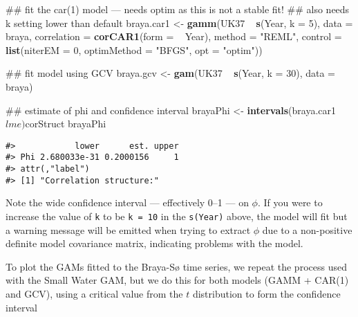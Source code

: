 \documentclass[12pt,]{article}
\newenvironment{Shaded}{\begin{snugshade}}{\end{snugshade}}
\newcommand{\KeywordTok}[1]{\textcolor[rgb]{0.13,0.29,0.53}{\textbf{{#1}}}}
\newcommand{\DataTypeTok}[1]{\textcolor[rgb]{0.13,0.29,0.53}{{#1}}}
\newcommand{\DecValTok}[1]{\textcolor[rgb]{0.00,0.00,0.81}{{#1}}}
\newcommand{\StringTok}[1]{\textcolor[rgb]{0.31,0.60,0.02}{{#1}}}
\newcommand{\NormalTok}[1]{{#1}}
\begin{document}
\begin{Shaded}
\begin{Highlighting}[]
\NormalTok{## fit the car(1) model --- needs optim as this is not a stable fit!}
\NormalTok{## also needs k setting lower than default}
\NormalTok{braya.car1 <-}\StringTok{ }\KeywordTok{gamm}\NormalTok{(UK37 ~}\StringTok{ }\KeywordTok{s}\NormalTok{(Year, }\DataTypeTok{k =} \DecValTok{5}\NormalTok{), }\DataTypeTok{data =} \NormalTok{braya, }
                   \DataTypeTok{correlation =} \KeywordTok{corCAR1}\NormalTok{(}\DataTypeTok{form =} \NormalTok{~}\StringTok{ }\NormalTok{Year),}
                   \DataTypeTok{method =} \StringTok{"REML"}\NormalTok{,}
                   \DataTypeTok{control =} \KeywordTok{list}\NormalTok{(}\DataTypeTok{niterEM =} \DecValTok{0}\NormalTok{, }\DataTypeTok{optimMethod =} \StringTok{"BFGS"}\NormalTok{, }
                                  \DataTypeTok{opt =} \StringTok{"optim"}\NormalTok{))}

\NormalTok{## fit model using GCV}
\NormalTok{braya.gcv <-}\StringTok{ }\KeywordTok{gam}\NormalTok{(UK37 ~}\StringTok{ }\KeywordTok{s}\NormalTok{(Year, }\DataTypeTok{k =} \DecValTok{30}\NormalTok{), }\DataTypeTok{data =} \NormalTok{braya)}

\NormalTok{## estimate of phi and confidence interval}
\NormalTok{brayaPhi <-}\StringTok{ }\KeywordTok{intervals}\NormalTok{(braya.car1$lme)$corStruct}
\NormalTok{brayaPhi}
\end{Highlighting}
\end{Shaded}

\begin{verbatim}
#>            lower      est. upper
#> Phi 2.680033e-31 0.2000156     1
#> attr(,"label")
#> [1] "Correlation structure:"
\end{verbatim}

Note the wide confidence interval --- effectively 0--1 --- on \(\phi\).
If you were to increase the value of \texttt{k} to be \texttt{k\ =\ 10}
in the \texttt{s(Year)} above, the model will fit but a warning message
will be emitted when trying to extract \(\phi\) due to a non-positive
definite model covariance matrix, indicating problems with the model.

To plot the GAMs fitted to the Braya-Sø time series, we repeat the
process used with the Small Water GAM, but we do this for both models
(GAMM + CAR(1) and GCV), using a critical value from the \(t\)
distribution to form the confidence interval
\end{document}
